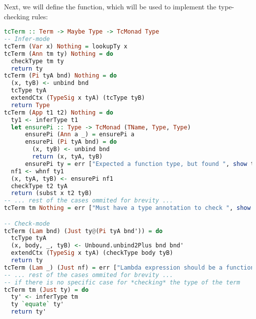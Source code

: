 Next, we will define the  function, which will be used to implement the type-checking rules:

\newpage
\begin{lstlisting}[language=Haskell]
tcTerm :: Term -> Maybe Type -> TcMonad Type
-- Infer-mode
tcTerm (Var x) Nothing = lookupTy x
tcTerm (Ann tm ty) Nothing = do
  checkType tm ty
  return ty
tcTerm (Pi tyA bnd) Nothing = do
  (x, tyB) <- unbind bnd
  tcType tyA
  extendCtx (TypeSig x tyA) (tcType tyB)
  return Type
tcTerm (App t1 t2) Nothing = do
  ty1 <- inferType t1
  let ensurePi :: Type -> TcMonad (TName, Type, Type)
      ensurePi (Ann a _) = ensurePi a
      ensurePi (Pi tyA bnd) = do
        (x, tyB) <- unbind bnd
        return (x, tyA, tyB)
      ensurePi ty = err ["Expected a function type, but found ", show ty]
  nf1 <- whnf ty1
  (x, tyA, tyB) <- ensurePi nf1
  checkType t2 tyA
  return (subst x t2 tyB)
-- ... rest of the cases ommited for brevity ...
tcTerm tm Nothing = err ["Must have a type annotation to check ", show tm]

-- Check-mode
tcTerm (Lam bnd) (Just ty@(Pi tyA bnd')) = do
  tcType tyA
  (x, body, _, tyB) <- Unbound.unbind2Plus bnd bnd'
  extendCtx (TypeSig x tyA) (checkType body tyB)
  return ty
tcTerm (Lam _) (Just nf) = err ["Lambda expression should be a function"]
-- ... rest of the cases ommited for brevity ...
-- if there is no specific case for *checking* the type of the term
tcTerm tm (Just ty) = do
  ty' <- inferType tm
  ty `equate` ty'
  return ty'
\end{lstlisting}

\newpage

